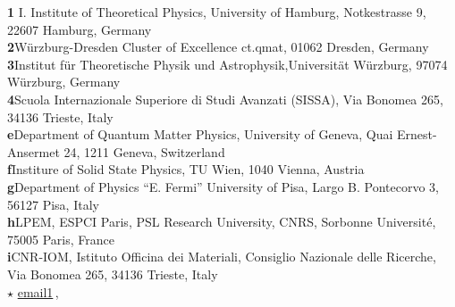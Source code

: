 \documentclass[dvipsnames]{SciPost}
\begin{document}
\begin{center}
  \newcommand{\CNRIOM}{CNR-IOM, Istituto Officina dei Materiali,
  Consiglio Nazionale delle Ricerche, Via Bonomea 265, 34136
  Trieste, Italy}
\newcommand{\SISSA}{Scuola Internazionale Superiore di Studi Avanzati (SISSA),
  Via Bonomea 265, 34136 Trieste, Italy}
\newcommand{\ITPHamburg}{I. Institute of Theoretical Physics,
  University of Hamburg, Notkestrasse 9, 22607 Hamburg, Germany}
\newcommand{\WZBURG}{Institut f\"ur Theoretische Physik und
  Astrophysik,Universit\"at W\"urzburg, 97074 W\"urzburg, Germany}
\newcommand{\CTQMAT}{W\"urzburg-Dresden Cluster of Excellence ct.qmat, 01062 Dresden, Germany}
\newcommand{\Geneve}{Department of Quantum Matter Physics, University of
  Geneva, Quai Ernest-Ansermet 24, 1211 Geneva, Switzerland}
\newcommand{\UPISA}{Department of Physics ``E. Fermi'' University of
  Pisa, Largo B. Pontecorvo 3, 56127 Pisa, Italy}
\newcommand{\ESPCI}{LPEM, ESPCI Paris, PSL Research University, CNRS, Sorbonne Universit\'e, 75005 Paris, France}
\newcommand{\TUW}{Institure of Solid State Physics, TU Wien, 1040 Vienna, Austria}

{\bf 1} \ITPHamburg\\
{\bf 2}\CTQMAT\\
{\bf 3}\WZBURG\\
{\bf 4}\SISSA\\
{\bf e}\Geneve\\
{\bf f}\TUW\\
{\bf g}\UPISA\\
{\bf h}\ESPCI\\
{\bf i}\CNRIOM\\
\vspace{\baselineskip}
$\star$ \href{mailto:email1}{\small email1}\,,\quad
\end{center}

\section*{\color{scipostdeepblue}{Abstract}}
\textbf{}
\end{document}
